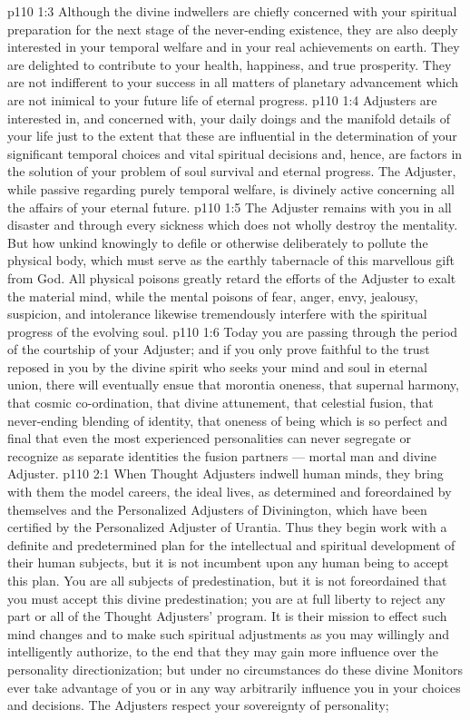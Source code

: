 \vs p110 1:3 Although the divine indwellers are chiefly concerned with your spiritual preparation for the next stage of the never\hyp{}ending existence, they are also deeply interested in your temporal welfare and in your real achievements on earth. They are delighted to contribute to your health, happiness, and true prosperity. They are not indifferent to your success in all matters of planetary advancement which are not inimical to your future life of eternal progress.
\vs p110 1:4 \pc Adjusters are interested in, and concerned with, your daily doings and the manifold details of your life just to the extent that these are influential in the determination of your significant temporal choices and vital spiritual decisions and, hence, are factors in the solution of your problem of soul survival and eternal progress. The Adjuster, while passive regarding purely temporal welfare, is divinely active concerning all the affairs of your eternal future.
\vs p110 1:5 The Adjuster remains with you in all disaster and through every sickness which does not wholly destroy the mentality. But how unkind knowingly to defile or otherwise deliberately to pollute the physical body, which must serve as the earthly tabernacle of this marvellous gift from God. All physical poisons greatly retard the efforts of the Adjuster to exalt the material mind, while the mental poisons of fear, anger, envy, jealousy, suspicion, and intolerance likewise tremendously interfere with the spiritual progress of the evolving soul.
\vs p110 1:6 \pc Today you are passing through the period of the courtship of your Adjuster; and if you only prove faithful to the trust reposed in you by the divine spirit who seeks your mind and soul in eternal union, there will eventually ensue that morontia oneness, that supernal harmony, that cosmic co\hyp{}ordination, that divine attunement, that celestial fusion, that never\hyp{}ending blending of identity, that oneness of being which is so perfect and final that even the most experienced personalities can never segregate or recognize as separate identities the fusion partners --- mortal man and divine Adjuster.
\vs p110 2:1 When Thought Adjusters indwell human minds, they bring with them the model careers, the ideal lives, as determined and foreordained by themselves and the Personalized Adjusters of Divinington, which have been certified by the Personalized Adjuster of Urantia. Thus they begin work with a definite and predetermined plan for the intellectual and spiritual development of their human subjects, but it is not incumbent upon any human being to accept this plan. You are all subjects of predestination, but it is not foreordained that you must accept this divine predestination; you are at full liberty to reject any part or all of the Thought Adjusters’ program. It is their mission to effect such mind changes and to make such spiritual adjustments as you may willingly and intelligently authorize, to the end that they may gain more influence over the personality directionization; but under no circumstances do these divine Monitors ever take advantage of you or in any way arbitrarily influence you in your choices and decisions. The Adjusters respect your sovereignty of personality; 
